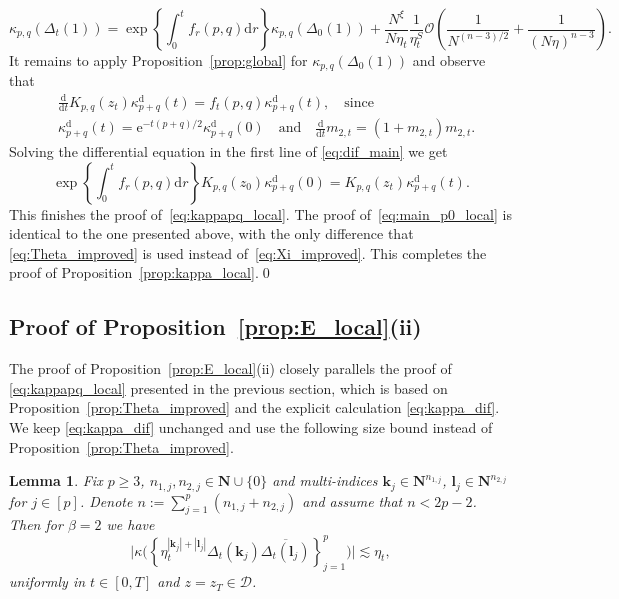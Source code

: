 \documentclass[10pt]{amsart}
\newtheorem{lemma}[theorem]{Lemma}
\numberwithin{equation}{section}
\newcommand{\nc}{\normalcolor}
\newcommand{\dif}{\mathrm{d}}
\newcommand{\N}{\mathbf{N}}
\newcommand{\ee}{\mathrm{e}}
\begin{document}
\begin{equation}
\kappa_{p,q}(\Delta_t(1)) = \exp\left\lbrace \int_0^t f_r(p,q)\dif r\right\rbrace \kappa_{p,q}(\Delta_0(1)) + \frac{N^\xi}{N\eta_t}\frac{1}{\eta_t^S}\mathcal{O}\left(\frac{1}{N^{(n-3)/2}} + \frac{1}{(N\eta)^{n-3}}\right).
\label{eq:kappa_pq_prefin_id}
\end{equation}
It remains to apply Proposition~\ref{prop:global} for $\kappa_{p,q}(\Delta_0(1))$ and observe that
\begin{equation}
\begin{split}
&\frac{\dif}{\dif t} K_{p,q}(z_t) \kappa_{p+q}^{\dif}(t) = f_t(p,q)\kappa_{p+q}^{\dif}(t), \quad\text{since}\\
&\kappa_{p+q}^{\dif}(t) = \ee^{-t(p+q)/2}\kappa_{p+q}^\dif(0)\quad\text{and}\quad \frac{\dif}{\dif t} m_{2,t}=\left(1+m_{2,t}\right)m_{2,t}.
\end{split}
\label{eq:dif_main}
\end{equation}
Solving the differential equation in the first line of \eqref{eq:dif_main} we get
\begin{equation}
\exp\left\lbrace \int_0^t f_r(p,q)\dif r\right\rbrace K_{p,q}(z_0) \kappa_{p+q}^\dif(0) = K_{p,q}(z_t) \kappa_{p+q}^\dif(t).
\end{equation}
This finishes the proof of~\eqref{eq:kappapq_local}. The proof of~\eqref{eq:main_p0_local} is identical to the one presented above, with the only difference that \eqref{eq:Theta_improved} is used instead of~\eqref{eq:Xi_improved}.
 This completes the proof of Proposition~\ref{prop:kappa_local}.\hfill\qed\nc








\subsection{Proof of Proposition~\ref{prop:E_local}(ii)}\label{sec:kappa_local} 

The proof of Proposition~\ref{prop:E_local}(ii) closely parallels the proof of  \eqref{eq:kappapq_local}
presented in the previous section, which is based on Proposition~\ref{prop:Theta_improved} and the explicit calculation \eqref{eq:kappa_dif}. We keep \eqref{eq:kappa_dif} unchanged and use the following size bound instead of Proposition~\ref{prop:Theta_improved}.

\begin{lemma}\label{lem:kappa_eta} Fix $p\ge 3$, $n_{1,j},n_{2,j}\in \N\cup\{0\}$ and multi-indices $\bm{k}_j\in\N^{n_{1,j}}$, $\bm{l}_j\in\N^{n_{2,j}}$ for $j\in [p]$. Denote $n:=\sum_{j=1}^p (n_{1,j}+n_{2,j})$ and assume that $n<2p-2$. Then for $\beta=2$ we have
\begin{equation}
\Big|\kappa\Big(\left\lbrace \eta_t^{|\bm{k}_j|+|\bm{l}_j|}\Delta_t(\bm{k}_j)\overline{\Delta_t(\bm{l}_j)}\right\rbrace_{j=1}^p\Big)\Big|\lesssim \eta_t,
\label{eq:kappa_eta}
\end{equation}
uniformly in $t\in [0,T]$ and $z=z_T\in\mathcal{D}$.
\end{lemma}
\end{document}
